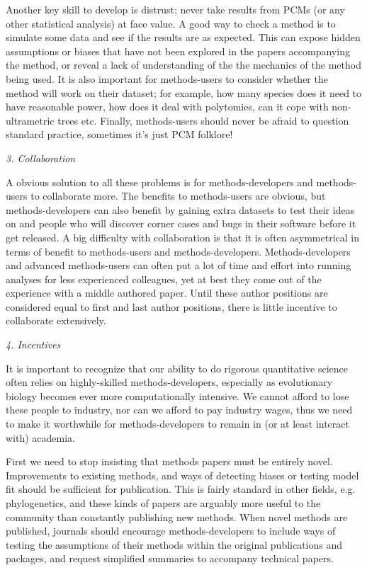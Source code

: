 \documentclass[a4paper,12pt]{article}
\renewcommand{\subsection}[1]{
  \bigskip
  \begin{center}
  \begin{large}
  \normalfont\itshape #1
  \end{large}
  \end{center}
}
\begin{document}
Another key skill to develop is distrust; never take results from PCMs (or any other statistical analysis) at face value. 
A good way to check a method is to simulate some data and see if the results are as expected. 
This can expose hidden assumptions or biases that have not been explored in the papers accompanying the method, or reveal a lack of understanding of the the mechanics of the method being used. 
It is also important for methods-users to consider whether the method will work on their dataset; for example, how many species does it need to have reasonable power, how does it deal with polytomies, can it cope with non-ultrametric trees etc.
Finally, methods-users should never be afraid to question standard practice, sometimes it's just PCM folklore!

\subsection{3. Collaboration}
A obvious solution to all these problems is for methods-developers and methods-users to collaborate more. 
The benefits to methods-users are obvious, but methods-developers can also benefit by gaining extra datasets to test their ideas on and people who will discover corner cases and bugs in their software before it get released. 
A big difficulty with collaboration is that it is often asymmetrical in terms of benefit to methods-users and methods-developers. 
Methods-developers and advanced methods-users can often put a lot of time and effort into running analyses for less experienced colleagues, yet at best they come out of the experience with a middle authored paper. 
Until these author positions are considered equal to first and last author positions, there is little incentive to collaborate extensively.

\subsection{4. Incentives}
It is important to recognize that our ability to do rigorous quantitative science often relies on highly-skilled methods-developers, especially as evolutionary biology becomes ever more computationally intensive. 
We cannot afford to lose these people to industry, nor can we afford to pay industry wages, thus we need to make it worthwhile for methods-developers to remain in (or at least interact with) academia.

First we need to stop insisting that methods papers must be entirely novel. 
Improvements to existing methods, and ways of detecting biases or testing model fit should be sufficient for publication. 
This is fairly standard in other fields, e.g. phylogenetics, and these kinds of papers are arguably more useful to the community than constantly publishing new methods.
When novel methods are published, journals should encourage methods-developers to include ways of testing the assumptions of their methods within the original publications and packages, and request simplified summaries to accompany technical papers.
\end{document}
